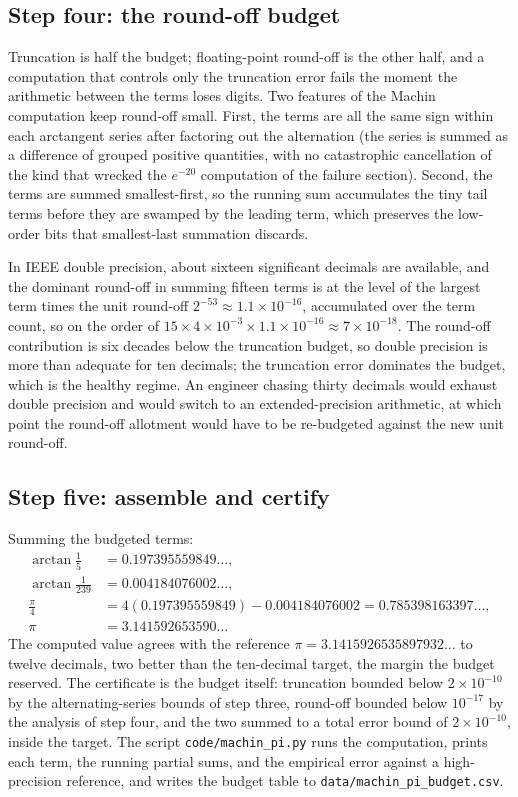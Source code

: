 \subsection{Step four: the round-off budget}

Truncation is half the budget; floating-point round-off is the other
half, and a computation that controls only the truncation error fails
the moment the arithmetic between the terms loses digits. Two features of
the Machin computation keep round-off small. First, the terms are all the
same sign within each arctangent series after factoring out the
alternation (the series is summed as a difference of grouped positive
quantities, with no catastrophic cancellation of the kind that wrecked
the $e^{-20}$ computation of the failure section). Second, the terms are
summed smallest-first, so the running sum accumulates the tiny tail terms
before they are swamped by the leading term, which preserves the
low-order bits that smallest-last summation discards.

In IEEE double precision, about sixteen significant decimals are
available, and the dominant round-off in summing fifteen terms is at
the level of the largest term times the unit round-off $2^{-53} \approx
1.1 \times 10^{-16}$, accumulated over the term count, so on the order
of $15 \times 4 \times 10^{-3} \times 1.1 \times 10^{-16} \approx 7
\times 10^{-18}$. The round-off contribution is six decades below the
truncation budget, so double precision is more than adequate for ten
decimals; the truncation error dominates the budget, which is the
healthy regime. An engineer chasing thirty decimals would exhaust double
precision and would switch to an extended-precision arithmetic, at which
point the round-off allotment would have to be re-budgeted against the
new unit round-off.

\subsection{Step five: assemble and certify}

Summing the budgeted terms:
\begin{align*}
\arctan\tfrac{1}{5} &= 0.197395559849\ldots, \\
\arctan\tfrac{1}{239} &= 0.004184076002\ldots, \\
\tfrac{\pi}{4} &= 4(0.197395559849) - 0.004184076002 =
0.785398163397\ldots, \\
\pi &= 3.141592653590\ldots
\end{align*}
The computed value agrees with the reference $\pi =
3.1415926535897932\ldots$ to twelve decimals, two better than the
ten-decimal target, the margin the budget reserved. The certificate is
the budget itself: truncation bounded below $2 \times 10^{-10}$ by the
alternating-series bounds of step three, round-off bounded below $10^{-17}$
by the analysis of step four, and the two summed to a total error bound
of $2 \times 10^{-10}$, inside the target. The script
\texttt{code/machin\_pi.py} runs the computation, prints each term, the
running partial sums, and the empirical error against a high-precision
reference, and writes the budget table to
\texttt{data/machin\_pi\_budget.csv}.

